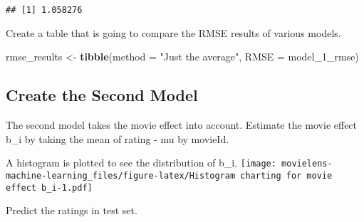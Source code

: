 \documentclass[]{article}
\newenvironment{Shaded}{\begin{snugshade}}{\end{snugshade}}
\newcommand{\KeywordTok}[1]{\textcolor[rgb]{0.13,0.29,0.53}{\textbf{#1}}}
\newcommand{\DataTypeTok}[1]{\textcolor[rgb]{0.13,0.29,0.53}{#1}}
\newcommand{\StringTok}[1]{\textcolor[rgb]{0.31,0.60,0.02}{#1}}
\newcommand{\OperatorTok}[1]{\textcolor[rgb]{0.81,0.36,0.00}{\textbf{#1}}}
\newcommand{\NormalTok}[1]{#1}
\begin{document}
\begin{verbatim}
## [1] 1.058276
\end{verbatim}

Create a table that is going to compare the RMSE results of various
models.

\begin{Shaded}
\begin{Highlighting}[]
\NormalTok{rmse_results <-}\StringTok{ }\KeywordTok{tibble}\NormalTok{(}\DataTypeTok{method =} \StringTok{"Just the average"}\NormalTok{, }\DataTypeTok{RMSE =}\NormalTok{ model_1_rmse)}
\end{Highlighting}
\end{Shaded}

\subsection{Create the Second Model}\label{create-the-second-model}

The second model takes the movie effect into account. Estimate the movie
effect b\_i by taking the mean of rating - mu by movieId.

\begin{Shaded}
\end{Shaded}

A histogram is plotted to see the distribution of b\_i.
\texttt{[image: movielens-machine-learning\_files/figure-latex/Histogram charting for movie effect b\_i-1.pdf]}

Predict the ratings in test set.

\begin{Shaded}
\end{Shaded}
\end{document}
